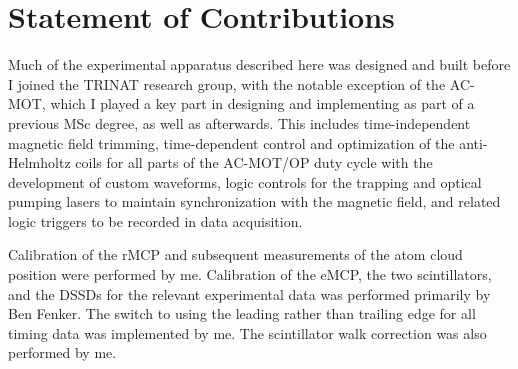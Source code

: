 

\clearpage
\chapter*{Statement of Contributions}
\label{ch:contributions}

%



Much of the experimental apparatus described here was designed and built before I joined the TRINAT research group, with the notable exception of the AC-MOT, which I played a key part in designing and implementing as part of a previous MSc degree\cite{thesis}, as well as afterwards.  This includes time-independent magnetic field trimming, time-dependent control and optimization of the anti-Helmholtz coils for all parts of the AC-MOT/OP duty cycle with the development of custom waveforms, logic controls for the trapping and optical pumping lasers to maintain synchronization with the magnetic field, and related logic triggers to be recorded in data acquisition.   

%

Calibration of the rMCP and subsequent measurements of the atom cloud position were performed by me.  Calibration of the eMCP, the two scintillators, and the DSSDs for the relevant experimental data was performed primarily by Ben Fenker.  The switch to using the leading rather than trailing edge for all timing data was implemented by me.  The scintillator walk correction was also performed by me.  


